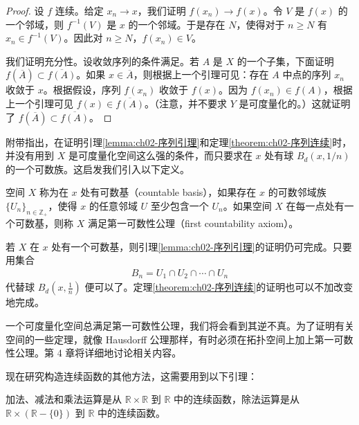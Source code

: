 \documentclass[../../main.tex]{subfiles}
\begin{document}
\begin{proof}
设 $f$ 连续。给定 $x_{n} \rightarrow x$，我们证明 $f(x_{n}) \rightarrow f(x)$。令 $V$ 是 $f(x)$ 的一个邻域，则 $f^{-1}(V)$ 是 $x$ 的一个邻域。于是存在 $N$，使得对于 $n \geqslant N$ 有 $x_{n} \in f^{-1}(V)$。因此对 $n \geqslant N$，$f(x_{n}) \in V$。

我们证明充分性。设收敛序列的条件满足。若 $A$ 是 $X$ 的一个子集，下面证明 $f(\overline{A}) \subset \overline{f(A)}$。如果 $x \in \overline{A}$，则根据上一个引理可见：存在 $A$ 中点的序列 $x_{n}$ 收敛于 $x$。根据假设，序列 $f(x_{n})$ 收敛于 $f(x)$。因为 $f(x_{n}) \in f(A)$，根据上一个引理可见 $f(x) \in \overline{f(A)}$。（注意，并不要求 $Y$ 是可度量化的。）这就证明了 $f(\overline{A}) \subset \overline{f(A)}$。
\end{proof}

附带指出，在证明引理\cref{lemma:ch02-序列引理}和定理\cref{theorem:ch02-序列连续}时，并没有用到 $X$ 是可度量化空间这么强的条件，而只要求在 $x$ 处有球 $B_{d}(x, 1/n)$ 的一个可数族。这启发我们引入以下定义。

\begin{definition}[可数基与第一可数性公理]\label{definition:ch02-第一可数性}
空间 $X$ 称为在 $x$ 处有可数基（countable basis），如果存在 $x$ 的可数邻域族 $\{U_{n}\}_{n \in \mathbb{Z}_{+}}$，使得 $x$ 的任意邻域 $U$ 至少包含一个 $U_{n}$。如果空间 $X$ 在每一点处有一个可数基，则称 $X$ 满足第一可数性公理（first countability axiom）。
\end{definition}

若 $X$ 在 $x$ 处有一个可数基，则引理\cref{lemma:ch02-序列引理}的证明仍可完成。只要用集合
\begin{align*}
B_{n} = U_{1} \cap U_{2} \cap \cdots \cap U_{n}
\end{align*}
代替球 $B_{d}(x, \frac{1}{n})$ 便可以了。定理\cref{theorem:ch02-序列连续}的证明也可以不加改变地完成。

一个可度量化空间总满足第一可数性公理，我们将会看到其逆不真。为了证明有关空间的一些定理，就像 Hausdorff 公理那样，有时必须在拓扑空间上加上第一可数性公理。第 4 章将详细地讨论相关内容。

现在研究构造连续函数的其他方法，这需要用到以下引理：

\begin{lemma}[算术运算的连续性]\label{lemma:ch02-算术连续}
加法、减法和乘法运算是从 $\mathbb{R} \times \mathbb{R}$ 到 $\mathbb{R}$ 中的连续函数，除法运算是从 $\mathbb{R} \times (\mathbb{R} - \{0\})$ 到 $\mathbb{R}$ 中的连续函数。
\end{lemma}
\end{document}
